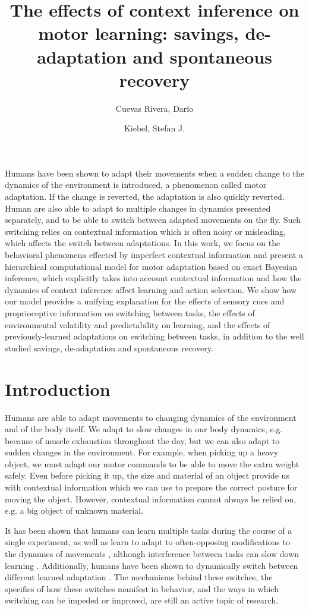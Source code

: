 \documentclass[a4paper,doc,floatsintext,natbib]{apa6}
\title{The effects of context inference on motor learning: savings, de-adaptation and spontaneous recovery}
\author[1,2]{Cuevas Rivera, Darío}
\author[1,2]{Kiebel, Stefan J.}
\affil[1]{Chair of Neuroimaging, Faculty of Psychology. Technische Universität Dresden, 01062 Dresden, Germany.}
\affil[2]{Centre for Tactile Internet with Human-in-the-Loop (CeTI)}
\affiliation{~}
\begin{document}
\maketitle

Humans have been shown to adapt their movements when a sudden change to the dynamics of the environment is introduced, a phenomenon called motor adaptation. If the change is reverted, the adaptation is also quickly reverted. Human are also able to adapt to multiple changes in dynamics presented separately, and to be able to switch between adapted movements on the fly. Such switching relies on contextual information which is often noisy or misleading, which affects the switch between adaptations. In this work, we focus on the behavioral phenomena effected by imperfect contextual information and present a hierarchical computational model for motor adaptation based on exact Bayesian inference, which explicitly takes into account contextual information and how the dynamics of context inference affect learning and action selection. We show how our model provides a unifying explanation for the effects of sensory cues and proprioceptive information on switching between tasks, the effects of environmental volatility and predictability on learning, and the effects of previously-learned adaptations on switching between tasks, in addition to the well studied savings, de-adaptation and spontaneous recovery.


\section{Introduction}
Humans are able to adapt movements to changing dynamics of the environment and of the body itself. We adapt to slow changes in our body dynamics, e.g. because of muscle exhaustion throughout the day, but we can also adapt to sudden changes in the environment. For example, when picking up a heavy object, we must adapt our motor commands to be able to move the extra weight safely. Even before picking it up, the size and material of an object provide us with contextual information which we can use to prepare the correct posture for moving the object. However, contextual information cannot always be relied on, e.g. a big object of unknown material.

It has been shown that humans can learn multiple tasks during the course of a single experiment, as well as learn to adapt to often-opposing modifications to the dynamics of movements \citep[e.g.][]{Gandolfo_Motor_1996,Shadmehr_Functional_1997}, although interference between tasks can slow down learning \citep[e.g.][]{Brashers-Krug_Consolidation_1996,Sing_Reduction_2010}. Additionally, humans have been shown to dynamically switch between different learned adaptation \citep[e.g.][]{Davidson_Scaling_2004,Ethier_Spontaneous_2008,Lee_Dual_2009}. The mechanisms behind these switches, the specifics of how these switches manifest in behavior, and the ways in which switching can be impeded or improved, are still an active topic of research.
\end{document}
